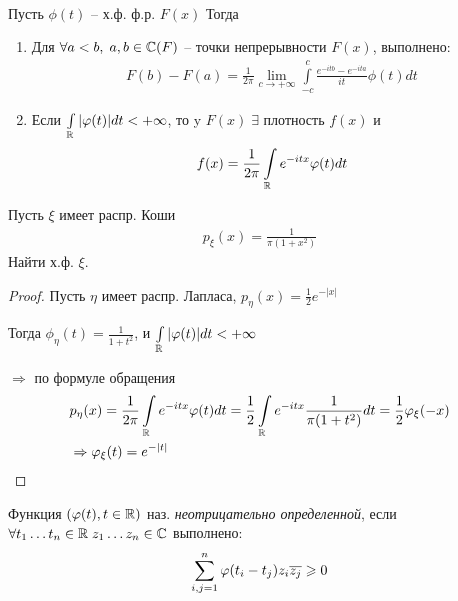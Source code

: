 \begin{theorem}~

  Пусть $\phi(t)$ -- х.ф. ф.р. $F(x)$
  Тогда
  \begin{enumerate}
    \item
      Для $\forall a < b, \; a, b \in \mathbb{C}(F)$ -- точки непрерывности $F(x)$, выполнено:
      \begin{align*}
        F(b) - F(a) = \frac{1}{2 \pi} \lim_{c \to +\infty} 
        \int\limits_{-c}^{c} \frac{e^{- i t b} - e^{- i t a}}{it} \phi(t) dt
      \end{align*}

    \item
      Если $\int\limits_{\mathbb{R}} |\varphi(t)| dt < +\infty$, 
      то y $F(x) \; \exists$ плотность $f(x)$ и
      \begin{align*}
        f(x) = \frac{1}{2\pi} \int\limits_{\mathbb{R}} e^{-i t x} \varphi(t) dt
      \end{align*}
  \end{enumerate}

\end{theorem}

\begin{example}
  Пусть $\xi$ имеет распр. Коши
  \begin{align*}
    p_{\xi} (x) = \frac{1}{\pi (1 + x^2)}
  \end{align*}
  Найти х.ф. $\xi$.

  \begin{proof}
    Пусть $\eta$ имеет распр. Лапласа, $p_{\eta} (x) = \frac{1}{2} e^{-|x|}$

    Тогда $\phi_{\eta} (t) = \frac{1}{1 + t^2}$, и
    $\int\limits_{\mathbb{R}} |\varphi(t)| dt < +\infty$

    $\Rightarrow$ по формуле обращения 
    \begin{align*}
      &p_{\eta}(x) = \frac{1}{2 \pi} \int\limits_{\mathbb{R}} e^{- i t x} \varphi(t) dt 
      = \frac{1}{2} \int\limits_{\mathbb{R}} e^{- i t x} \frac{1}{\pi (1 + t^2)} dt
      = \frac{1}{2} \varphi_\xi (-x)\\
      &\Rightarrow  \varphi_{\xi} (t) = e^{-|t|}
    \end{align*}
  \end{proof}
\end{example}


\begin{definition}
  Функция $(\varphi(t), t \in \mathbb{R})$ наз. \emph{неотрицательно определенной},
  если $\forall t_1 \ldots t_n \in \mathbb{R} \; z_1 \ldots z_n \in \mathbb{C}$ выполнено:
  \begin{align*}
    \sum_{i, j = 1}^{n} \varphi(t_i - t_j) z_i \overline{z_j} \geqslant 0
  \end{align*}
\end{definition}

